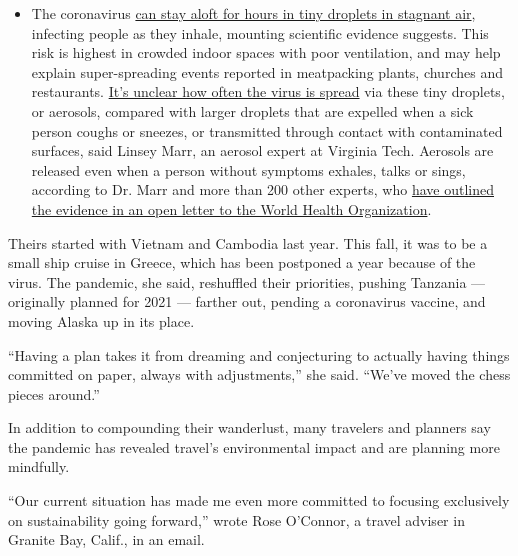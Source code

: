 \begin{itemize}
  \begin{itemize}
  \tightlist
  \item
    The coronavirus
    \href{https://www.nytimes3xbfgragh.onion/2020/07/04/health/239-experts-with-one-big-claim-the-coronavirus-is-airborne.html?action=click\&pgtype=Article\&state=default\&region=MAIN_CONTENT_3\&context=storylines_faq}{can
    stay aloft for hours in tiny droplets in stagnant air}, infecting
    people as they inhale, mounting scientific evidence suggests. This
    risk is highest in crowded indoor spaces with poor ventilation, and
    may help explain super-spreading events reported in meatpacking
    plants, churches and restaurants.
    \href{https://www.nytimes3xbfgragh.onion/2020/07/06/health/coronavirus-airborne-aerosols.html?action=click\&pgtype=Article\&state=default\&region=MAIN_CONTENT_3\&context=storylines_faq}{It's
    unclear how often the virus is spread} via these tiny droplets, or
    aerosols, compared with larger droplets that are expelled when a
    sick person coughs or sneezes, or transmitted through contact with
    contaminated surfaces, said Linsey Marr, an aerosol expert at
    Virginia Tech. Aerosols are released even when a person without
    symptoms exhales, talks or sings, according to Dr. Marr and more
    than 200 other experts, who
    \href{https://academic.oup.com/cid/article/doi/10.1093/cid/ciaa939/5867798}{have
    outlined the evidence in an open letter to the World Health
    Organization}.
  \end{itemize}
\end{itemize}

Theirs started with Vietnam and Cambodia last year. This fall, it was to
be a small ship cruise in Greece, which has been postponed a year
because of the virus. The pandemic, she said, reshuffled their
priorities, pushing Tanzania --- originally planned for 2021 --- farther
out, pending a coronavirus vaccine, and moving Alaska up in its place.

``Having a plan takes it from dreaming and conjecturing to actually
having things committed on paper, always with adjustments,'' she said.
``We've moved the chess pieces around.''

In addition to compounding their wanderlust, many travelers and planners
say the pandemic has revealed travel's environmental impact and are
planning more mindfully.

``Our current situation has made me even more committed to focusing
exclusively on sustainability going forward,'' wrote Rose O'Connor, a
travel adviser in Granite Bay, Calif., in an email.

